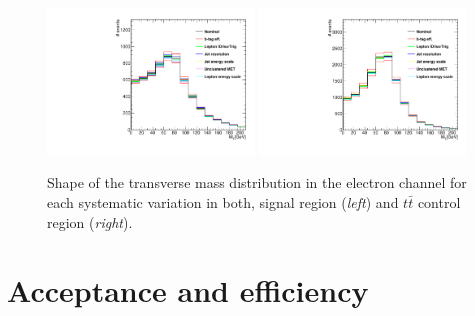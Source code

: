 \begin{figure}[htbp]
	\centering
		\includegraphics[width=0.49\textwidth]{Figures/Results/Electron/systPlots/syst_Wbb_GetVMt.pdf}
		\includegraphics[width=0.49\textwidth]{Figures/Results/Electron/systPlots/syst_TT_GetVMt.pdf}
	\caption[Shape of the systematic variations in electron channel for signal region and $t\bar{t}$ control region.]{Shape of the transverse mass distribution in the electron channel for each systematic variation in both, signal region (\textit{left}) and $t\bar{t}$ control region (\textit{right}).}
	\label{fig:shapeVar_ele}
\end{figure}

\section{Acceptance and efficiency}
\label{sec:AE}
    
